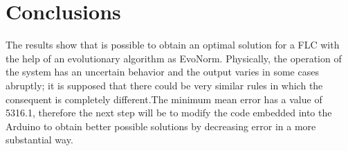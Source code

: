 \documentclass{sig-alternate-05-2015}
\begin{document}
\section{Conclusions}

The results show that is possible to obtain an optimal solution for a FLC with the help of an evolutionary algorithm as EvoNorm. Physically, the operation of the system has an uncertain behavior and the output varies in some cases abruptly; it is supposed that there could be very similar rules in which the consequent is completely different.The minimum mean error has a value of 5316.1, therefore the next step will be to modify the code embedded into the Arduino to obtain better possible solutions by decreasing error in a more substantial way.


%

\end{document}
